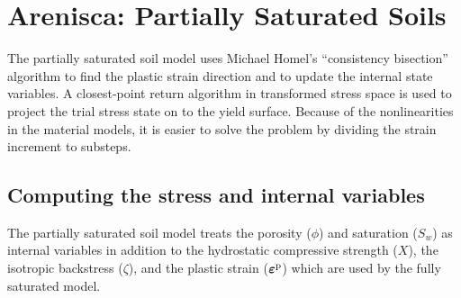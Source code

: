 \chapter{Arenisca: Partially Saturated Soils}

The partially saturated soil model uses Michael Homel's ``consistency bisection'' algorithm 
to find the plastic strain direction and to update the internal state variables.  A closest-point
return algorithm in transformed stress space is used to project the trial stress state on to the
yield surface. 
Because of the nonlinearities in the material models, it is easier to solve the problem by 
dividing the strain increment to substeps.

\section{Computing the stress and internal variables}
The partially saturated soil model treats the porosity ($\phi$) and saturation ($S_w$) as internal 
variables in addition to the hydrostatic compressive strength ($X$), the isotropic backstress ($\zeta$), 
and the plastic strain ($\boldsymbol{\varepsilon}^{\text{p}}$) which are used by the fully saturated model.


